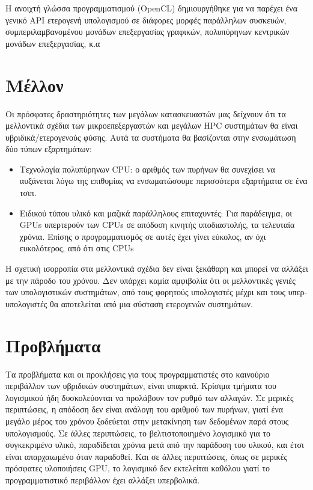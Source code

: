 Η ανοιχτή γλώσσα προγραμματισμού (OpenCL) δημιουργήθηκε για να παρέχει ένα γενικό API ετερογενή υπολογισμού σε διάφορες μορφές παράλληλων συσκευών, συμπεριλαμβανομένου μονάδων επεξεργασίας γραφικών, πολυπύρηνων κεντρικών μονάδων επεξεργασίας, κ.α
\section{Μέλλον}
Οι πρόσφατες δραστηριότητες των μεγάλων κατασκευαστών μας δείχνουν ότι τα μελλοντικά σχέδια των μικροεπεξεργαστών και μεγάλων HPC συστημάτων θα είναι υβριδικά/ετερογενούς φύσης. Αυτά τα συστήματα θα βασίζονται στην ενσωμάτωση δύο τύπων εξαρτημάτων:
\begin{itemize}
\item Τεχνολογία πολυπύρηνων CPU: ο αριθμός των πυρήνων θα συνεχίσει να αυξάνεται λόγω της επιθυμίας να ενσωματώσουμε περισσότερα εξαρτήματα σε ένα τσιπ.
\item Ειδικού τύπου υλικό και μαζικά παράλληλους επιταχυντές: Για παράδειγμα, οι GPUs υπερτερούν των CPUs σε απόδοση κινητής υποδιαστολής, τα τελευταία χρόνια. Επίσης ο προγραμματισμός σε αυτές έχει γίνει εύκολος, αν όχι ευκολότερος, από ότι στις CPUs
\end{itemize}
Η σχετική ισορροπία στα μελλοντικά σχέδια δεν είναι ξεκάθαρη και μπορεί να αλλάξει με την πάροδο του χρόνου. Δεν υπάρχει καμία αμφιβολία ότι οι μελλοντικές γενιές των υπολογιστικών συστημάτων, από τους φορητούς υπολογιστές μέχρι και τους υπερ-υπολογιστές θα αποτελείται από μια σύσταση ετερογενών συστημάτων. 
\section{Προβλήματα}
Τα προβλήματα και οι προκλήσεις για τους προγραμματιστές στο καινούριο περιβάλλον των υβριδικών συστημάτων, είναι υπαρκτά. Κρίσιμα τμήματα του λογισμικού ήδη δυσκολεύονται να προλάβουν τον ρυθμό των αλλαγών. Σε μερικές περιπτώσεις, η απόδοση δεν είναι ανάλογη του αριθμού των πυρήνων, γιατί ένα μεγάλο μέρος του χρόνου ξοδεύεται στην μετακίνηση των δεδομένων παρά στους υπολογισμούς. Σε άλλες περιπτώσεις, το βελτιστοποιημένο λογισμικό για το συγκεκριμένο υλικό, παραδίδεται χρόνια μετά από την παράδοση του υλικού, και έτσι είναι απαρχαιωμένο όταν παραδοθεί. Και σε άλλες περιπτώσεις, όπως σε μερικές πρόσφατες υλοποιήσεις GPU, το λογισμικό δεν εκτελείται καθόλου γιατί το προγραμματιστικό περιβάλλον έχει αλλάξει υπερβολικά.
